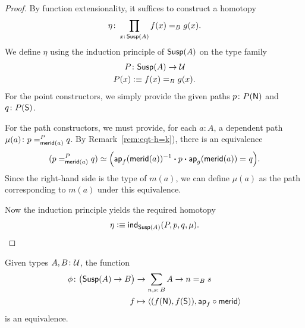 \begin{proof}
    By function extensionality, it suffices to construct a homotopy
    \[
        \eta\colon\prod_{x\colon\fun{Susp}(A)}f(x)\eq{B}g(x).
    \]
    We define $\eta$ using the induction principle of $\mathsf{Susp}(A)$ on the type family
    \begin{align*}
        P&\colon\fun{Susp}(A)\to\univ\\
        P(x)&\defeq f(x)\eq{B}g(x).
    \end{align*}
    For the point constructors, we simply provide the given paths $p\colon P(\fun N)$ and $q\colon P(\fun S)$.

    For the path constructors, we must provide, for each $a\colon A$, a dependent path $\mu(a)\colon p\eqt{\fun{merid}(a)}Pq$. By Remark~\ref{rem:eqt-h=k}), there is an equivalence
    \[
        (p=_{\mathsf{merid}(a)}^{P}q)
        \simeq
        \Bigl(
            \mathsf{ap}_f(\mathsf{merid}(a))^{-1}\mathbin{\boldsymbol{\cdot}} p\mathbin{\boldsymbol{\cdot}}\mathsf{ap}_g(\mathsf{merid}(a))\mathrel{=_{}}q
        \Bigr).
    \]
    Since the right-hand side is the type of $m(a)$, we can define $\mu(a)$ as the path corresponding to $m(a)$ under this equivalence.

    Now the induction principle yields the required homotopy
    \[
        \eta\mathrel{\vcentcolon}\equiv\mathsf{ind}_{\mathsf{Susp}(A)}(P,p,q,\mu).
        \qedhere
    \]
\end{proof}

\begin{prop}\label{prop:unpointed-susp-maps}
    Given types $A,B\colon\univ$, the function
    \begin{align*}
        \phi\colon\bigl(\fun{Susp}(A)\to B\bigr)
            &\to\sum_{n,s\colon B}A\to n\eq{B}s\\
        f&\mapsto\dep{
            (f(\fun N),f(\fun S)),
            \fun{ap}_f\circ\fun{merid}
        }
    \end{align*}
    is an equivalence.
\end{prop}

